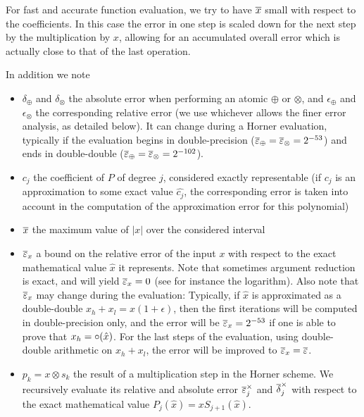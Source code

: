   For fast and accurate function evaluation, we try to have ${\overline{x}}$
  small with respect to the coefficients.  In this case the error in
  one step is scaled down for the next step by the multiplication by
  $x$, allowing for an accumulated overall error which is actually
  close to that of the last operation. 

  
  
In addition we note 
\begin{itemize}
  
\item $\delta_\oplus$ and $\delta_\otimes$ the absolute error when
  performing an atomic $\oplus$ or $\otimes$, and $\epsilon_\oplus$
  and $\epsilon_\otimes$ the corresponding relative error (we use
  whichever allows the finer error analysis, as detailed below).  It
  can change during a Horner evaluation, typically if the evaluation
  begins in double-precision
  (${\overline{\varepsilon}}_\oplus={\overline{\varepsilon}}_\otimes=2^{-53}$) and ends in double-double
  (${\overline{\varepsilon}}_\oplus={\overline{\varepsilon}}_\otimes=2^{-102}$).

\item $c_j$ the coefficient of $P$ of degree $j$, considered exactly
  representable (if $c_j$ is an approximation to some exact value
  $\hat{c_j}$, the corresponding error is taken into account in the
  computation of the approximation error for this polynomial)

\item ${\overline{x}}$ the maximum value of $|x|$ over the considered interval
  
\item ${\overline{\varepsilon}}_x$  a bound on the relative error of the input $x$
  with respect to the exact mathematical value $\hat{x}$ it
  represents. Note that sometimes argument reduction is exact, and
  will yield ${\overline{\varepsilon}}_x=0$ (see for instance the logarithm). Also
  note that ${\overline{\varepsilon}}_x$ may change during the evaluation: Typically,
  if $\hat{x}$ is approximated as a double-double
  $x_h+x_l=\hat{x}(1+\epsilon)$, then the first iterations will be
  computed in double-precision only, and the error will be
  ${\overline{\varepsilon}}_x=2^{-53}$ if one is able to prove that
  $x_h=\circ(\hat{x})$. For the last steps of the evaluation, using
  double-double arithmetic on $x_h+x_l$, the error will be improved to
  ${\overline{\varepsilon}}_x={\overline{\varepsilon}}$.
  
\item $p_k = x \otimes s_k $ the result of a multiplication step in
  the Horner scheme. We recursively evaluate its relative and absolute
  error ${\overline{\varepsilon}}^\times_j$ and ${\overline{\delta}}^\times_j$ with respect to
  the exact mathematical value $P_j(\hat{x})=xS_{j+1}(\hat{x})$.


\end{itemize}
